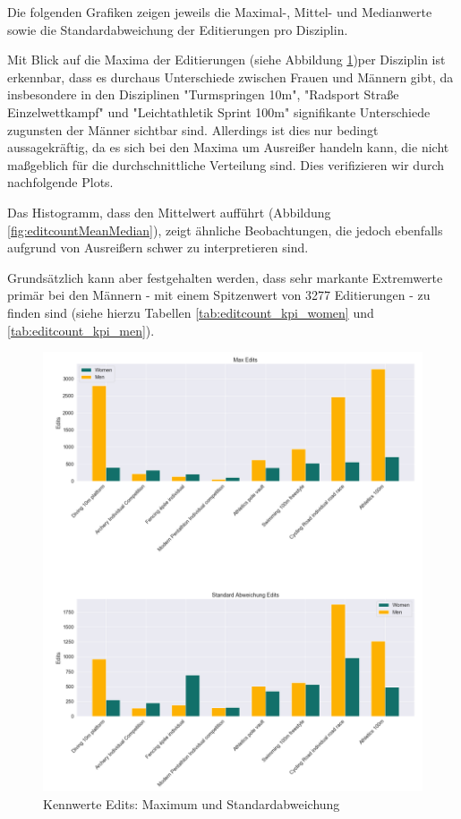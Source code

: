 \documentclass[11pt]{article}
\begin{document}
Die folgenden Grafiken zeigen jeweils die Maximal-, Mittel- und Medianwerte sowie die Standardabweichung der Editierungen pro Disziplin. 

Mit Blick auf die Maxima der Editierungen (siehe Abbildung \ref{fig:editcountMaxStd})per Disziplin ist erkennbar, dass es durchaus Unterschiede zwischen Frauen und Männern gibt, da insbesondere in den Disziplinen "Turmspringen 10m", "Radsport Straße Einzelwettkampf" und "Leichtathletik Sprint 100m" signifikante Unterschiede zugunsten der Männer sichtbar sind. Allerdings ist dies nur bedingt aussagekräftig, da es sich bei den Maxima um Ausreißer handeln kann, die nicht maßgeblich für die durchschnittliche Verteilung sind. Dies verifizieren wir durch nachfolgende Plots.

Das Histogramm, dass den Mittelwert aufführt (Abbildung \ref{fig:editcountMeanMedian}), zeigt ähnliche Beobachtungen, die jedoch ebenfalls aufgrund von Ausreißern schwer zu interpretieren sind.

Grundsätzlich kann aber festgehalten werden, dass sehr markante Extremwerte primär bei den Männern - mit einem Spitzenwert von 3277 Editierungen - zu finden sind (siehe hierzu Tabellen \ref{tab:editcount_kpi_women} und \ref{tab:editcount_kpi_men}).

\begin{figure}
\includegraphics[width=1\textwidth]{figures/editcount_max_std.png}
\caption[Kennwerte Editierungen: Maximum und Standardabweichung]{Kennwerte Edits: Maximum und Standardabweichung}
\label{fig:editcountMaxStd}
\end{figure}
\end{document}
